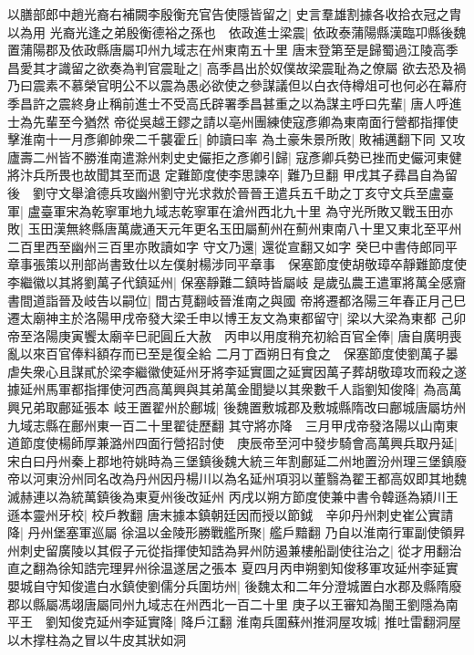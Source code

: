 以膳部郎中趙光裔右補闕李殷衡充官告使隱皆留之|{
	史言羣雄割據各收拾衣冠之胄以為用}
光裔光逢之弟殷衡德裕之孫也　依政進士梁震|{
	依政泰蒲陽縣漢臨卭縣後魏置蒲陽郡及依政縣唐屬卭州九域志在州東南五十里}
唐末登第至是歸蜀過江陵高季昌愛其才識留之欲奏為判官震耻之|{
	高季昌出於奴僕故梁震耻為之僚屬}
欲去恐及禍乃曰震素不慕榮官明公不以震為愚必欲使之參謀議但以白衣侍樽俎可也何必在幕府季昌許之震終身止稱前進士不受高氏辟署季昌甚重之以為謀主呼曰先輩|{
	唐人呼進士為先輩至今猶然}
帝從吳越王鏐之請以亳州團練使寇彥卿為東南面行營都指揮使擊淮南十一月彥卿帥衆二千襲霍丘|{
	帥讀曰率}
為土豪朱景所敗|{
	敗補邁翻下同}
又攻廬壽二州皆不勝淮南遣滁州刺史史儼拒之彥卿引歸|{
	寇彥卿兵勢已挫而史儼河東健將汴兵所畏也故聞其至而退}
定難節度使李思諫卒|{
	難乃旦翻}
甲戌其子彞昌自為留後　劉守文舉滄德兵攻幽州劉守光求救於晉晉王遣兵五千助之丁亥守文兵至盧臺軍|{
	盧臺軍宋為乾寧軍地九域志乾寧軍在滄州西北九十里}
為守光所敗又戰玉田亦敗|{
	玉田漢無終縣唐萬歲通天元年更名玉田屬薊州在薊州東南八十里又東北至平州二百里西至幽州三百里亦敗讀如字}
守文乃還|{
	還從宣翻又如字}
癸巳中書侍郎同平章事張策以刑部尚書致仕以左僕射楊涉同平章事　保塞節度使胡敬璋卒靜難節度使李繼徽以其將劉萬子代鎮延州|{
	保塞靜難二鎮時皆屬岐}
是歲弘農王遣軍將萬全感齎書間道詣晉及岐告以嗣位|{
	間古莧翻岐晉淮南之與國}
帝將遷都洛陽三年春正月己巳遷太廟神主於洛陽甲戌帝發大梁壬申以博王友文為東都留守|{
	梁以大梁為東都}
己卯帝至洛陽庚寅饗太廟辛巳祀圓丘大赦　丙申以用度稍充初給百官全俸|{
	唐自廣明喪亂以來百官俸料額存而已至是復全給}
二月丁酉朔日有食之　保塞節度使劉萬子㬥虐失衆心且謀貳於梁李繼徽使延州牙將李延實圖之延實因萬子葬胡敬璋攻而殺之遂據延州馬軍都指揮使河西高萬興與其弟萬金聞變以其衆數千人詣劉知俊降|{
	為高萬興兄弟取鄜延張本}
岐王置翟州於鄜城|{
	後魏置敷城郡及敷城縣隋改曰鄜城唐屬坊州九域志縣在鄜州東一百二十里翟徒歷翻}
其守將亦降　三月甲戌帝發洛陽以山南東道節度使楊師厚兼潞州四面行營招討使　庚辰帝至河中發步騎會高萬興兵取丹延|{
	宋白曰丹州秦上郡地符姚時為三堡鎮後魏大統三年割鄜延二州地置汾州理三堡鎮廢帝以河東汾州同名改為丹州因丹楊川以為名延州項羽以董翳為翟王都高奴即其地魏滅赫連以為統萬鎮後為東夏州後改延州}
丙戌以朔方節度使兼中書令韓遜為潁川王遜本靈州牙校|{
	校戶教翻}
唐末據本鎮朝廷因而授以節鉞　辛卯丹州刺史崔公實請降|{
	丹州堡塞軍巡屬}
徐温以金陵形勝戰艦所聚|{
	艦戶黯翻}
乃自以淮南行軍副使領昇州刺史留廣陵以其假子元從指揮使知誥為昇州防遏兼樓船副使往治之|{
	從才用翻治直之翻為徐知誥完理昇州徐温遂居之張本}
夏四月丙申朔劉知俊移軍攻延州李延實嬰城自守知俊遣白水鎮使劉儒分兵圍坊州|{
	後魏太和二年分澄城置白水郡及縣隋廢郡以縣屬馮翊唐屬同州九域志在州西北一百二十里}
庚子以王審知為閩王劉隱為南平王　劉知俊克延州李延實降|{
	降戶江翻}
淮南兵圍蘇州推洞屋攻城|{
	推吐雷翻洞屋以木撑柱為之冒以牛皮其狀如洞}
